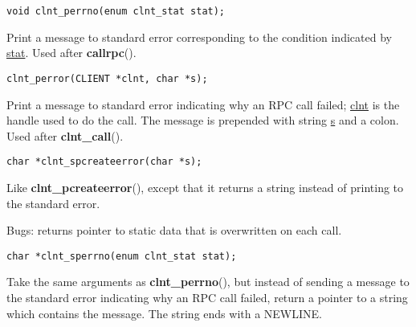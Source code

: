 \documentclass[]{article}
\let\realtextbf=\textbf
\renewcommand{\textbf}[1]{\textcolor{boldcolor}{\realtextbf{#1}}}
\renewcommand{\emph}[1]{\underline{#1}}
\begin{document}
\begin{verbatim}
void clnt_perrno(enum clnt_stat stat);
\end{verbatim}

\begin{description}
\itemsep1pt\parskip0pt
\item[]
Print a message to standard error corresponding to the condition
indicated by \emph{stat}. Used after \textbf{callrpc}().
\end{description}

\begin{verbatim}
clnt_perror(CLIENT *clnt, char *s);
\end{verbatim}

\begin{description}
\itemsep1pt\parskip0pt
\item[]
Print a message to standard error indicating why an RPC call failed;
\emph{clnt} is the handle used to do the call. The message is prepended
with string \emph{s} and a colon. Used after \textbf{clnt\_call}().
\end{description}

\begin{verbatim}
char *clnt_spcreateerror(char *s);
\end{verbatim}

\begin{description}
\itemsep1pt\parskip0pt
\item[]
Like \textbf{clnt\_pcreateerror}(), except that it returns a string
instead of printing to the standard error.
\end{description}

\begin{description}
\itemsep1pt\parskip0pt
\item[]
Bugs: returns pointer to static data that is overwritten on each call.
\end{description}

\begin{verbatim}
char *clnt_sperrno(enum clnt_stat stat);
\end{verbatim}

\begin{description}
\itemsep1pt\parskip0pt
\item[]
Take the same arguments as \textbf{clnt\_perrno}(), but instead of
sending a message to the standard error indicating why an RPC call
failed, return a pointer to a string which contains the message. The
string ends with a NEWLINE.
\end{description}
\end{document}
